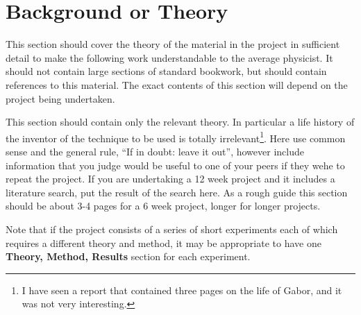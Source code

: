 \section{Background or Theory}

This section should cover the theory of the material in the project
in sufficient detail to make the following work understandable to the
average physicist. It should not contain large sections of standard
bookwork, but should contain references to this material. The exact
contents of this section will depend on the project being undertaken.

This section should contain only the
relevant theory. In particular a life history of the inventor of the
technique to be used is
totally irrelevant\footnote{I have seen a report that contained three pages
on the life of Gabor, and it was not very interesting.}. Here use common sense
and the general rule, ``If in doubt: leave it out'', however
include information that you judge would be useful to one of your
peers if they wehe to repeat the project. If you are
undertaking a 12 week project and it includes a literature search, put the
result of the search here. As a rough guide this section should be
about 3-4 pages for a 6 week project, longer for longer projects.

Note that if the project consists of a series of short experiments
each of which requires a different theory and method, it may be appropriate
to have one {\bf Theory, Method, Results} section for each
experiment.